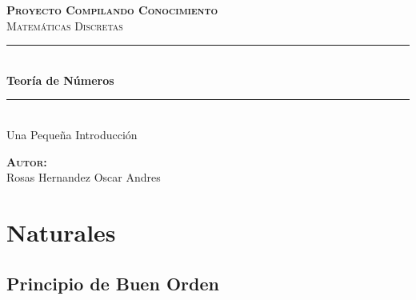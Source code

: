\documentclass[12pt]{report}                                    %
\author{Oscar Andrés Rosas}                                     %
\begin{document}
\begin{titlepage}

	\center
	\textbf{\textsc{\Large Proyecto Compilando Conocimiento}}\\[1.0cm] 
	\textsc{\Large Matemáticas Discretas}\\[1.0cm] 

	\rule{\linewidth}{0.5mm} \\[1.0cm]
		{ \huge \bfseries Teoría de Números}\\[1.0cm] 
	\rule{\linewidth}{0.5mm} \\[2.0cm]
	
	{\LARGE Una Pequeña Introducción}\\[7cm] 
	
	\begin{center} \large
	\textbf{\textsc{Autor:}}\\
	Rosas Hernandez Oscar Andres
	\end{center}

	\vfill

\end{titlepage}

\tableofcontents{}
\label{sec:Index}

\clearpage










\chapter{Naturales}
    \clearpage

    \section{Principio de Buen Orden}
\end{document}

